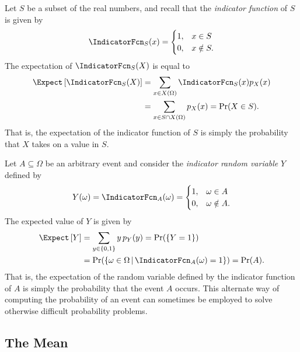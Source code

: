 \begin{example}
Let $S$ be a subset of the real numbers, and recall that the \emph{indicator function} of $S$ is given by 
\begin{equation*}
\IndicatorFcn_S (x) = \begin{cases} 1, & x \in S\\
0, & x \notin S . \end{cases}
\end{equation*}
The expectation of $\IndicatorFcn_S (X)$ is equal to
\begin{equation*}
\begin{split}
\Expect \left[ \IndicatorFcn_S (X) \right]
&= \sum_{x \in X(\Omega)} \IndicatorFcn_S (x) p_X(x) \\
&= \sum_{x \in S \cap X(\Omega)} p_X(x)
= \Pr (X \in S) .
\end{split}
\end{equation*}
That is, the expectation of the indicator function of $S$ is simply the probability that $X$ takes on a value in $S$.
\end{example}

\begin{example}
Let $A\subseteq \Omega$ be an arbitrary event and consider the \emph{indicator random variable} $Y$ defined by
\begin{equation*}
Y(\omega) = \IndicatorFcn_A (\omega) = \begin{cases} 1, & \omega \in A\\
0, & \omega \notin A. \end{cases}
\end{equation*}
The expected value of $Y$ is given by
\begin{equation*}
\begin{split}
\Expect \left[ Y \right]
&= \sum_{y \in \{0,1\}} y \, p_Y (y) = \Pr (\{Y = 1\}) \\
& = \Pr ( \{ \omega \in \Omega\, | \, \IndicatorFcn_A (\omega) = 1 \} ) = \Pr (A ).
\end{split}
\end{equation*}
That is, the expectation of the random variable defined by the indicator function of $A$ is simply the probability that the event $A$ occurs.
This alternate way of computing the probability of an event can sometimes be employed to solve otherwise difficult probability problems.
\end{example}

\subsection{The Mean}

